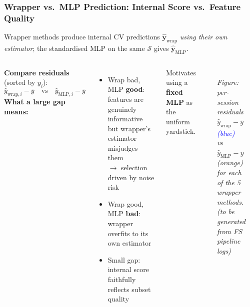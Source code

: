 \documentclass[aspectratio=169]{beamer}
\begin{document}
\begin{frame}
    \frametitle{Wrapper vs.\ MLP Prediction: Internal Score vs.\ Feature Quality}
    \scriptsize
    Wrapper methods produce internal CV predictions $\hat{\mathbf{y}}_\text{wrap}$
    \emph{using their own estimator}; the standardised MLP on the same $\mathcal{S}$ gives
    $\hat{\mathbf{y}}_\text{MLP}$.\\[0.4em]
    \begin{columns}[T]
        \textbf{Compare residuals} (sorted by $y_i$):
        \[
            \hat{y}_{\text{wrap},i} - \bar{y}
            \quad \text{vs} \quad
            \hat{y}_{\text{MLP},i} - \bar{y}
        \]
        \vspace{0.3em}
        \textbf{What a large gap means:}
        \begin{itemize}\setlength\itemsep{0.2em}
            \item Wrap bad, MLP \textbf{good}: features are genuinely informative
                  but wrapper's estimator misjudges them\\
                  $\to$ selection driven by noise risk
            \item Wrap good, MLP \textbf{bad}: wrapper overfits to its own estimator
            \item Small gap: internal score faithfully reflects subset quality
        \end{itemize}
        \vspace{0.3em}
        Motivates using a \textbf{fixed MLP} as the uniform yardstick.

        \centering
        \vspace{0.5em}
        {\color{gray}\rule{0.9\textwidth}{0.4pt}}\\[0.3em]
        \textit{\footnotesize Figure: per-session residuals\\[0.2em]
        $\hat{y}_{\text{wrap}} - \bar{y}$ \textcolor{blue}{(blue)}\\
        vs $\hat{y}_{\text{MLP}} - \bar{y}$ \textcolor{orange!80!black}{(orange)}\\
        for each of the 5 wrapper methods.\\[0.5em]
        \textnormal{(to be generated from FS pipeline logs)}}\\[0.3em]
        {\color{gray}\rule{0.9\textwidth}{0.4pt}}
    \end{columns}
\end{frame}
\end{document}
